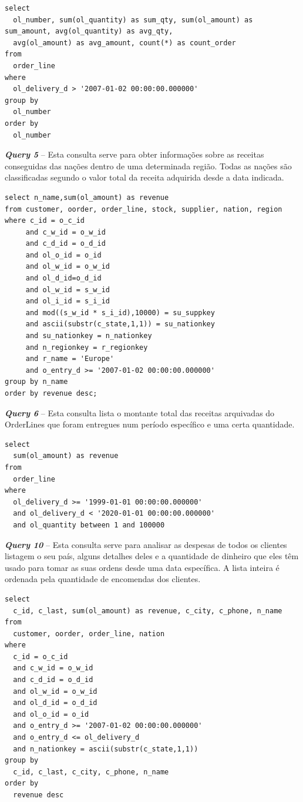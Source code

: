 \begin{verbatim}
select
  ol_number, sum(ol_quantity) as sum_qty, sum(ol_amount) as sum_amount, avg(ol_quantity) as avg_qty,
  avg(ol_amount) as avg_amount, count(*) as count_order
from
  order_line
where
  ol_delivery_d > '2007-01-02 00:00:00.000000'
group by
  ol_number
order by
  ol_number
\end{verbatim}


\textbf{\textit{Query 5}} – Esta consulta serve para obter informações sobre as receitas conseguidas das nações dentro de uma determinada região. Todas as nações são classificadas segundo o valor total da receita adquirida desde a data indicada.

\begin{verbatim}
select n_name,sum(ol_amount) as revenue
from customer, oorder, order_line, stock, supplier, nation, region
where c_id = o_c_id
     and c_w_id = o_w_id
     and c_d_id = o_d_id
     and ol_o_id = o_id
     and ol_w_id = o_w_id
     and ol_d_id=o_d_id
     and ol_w_id = s_w_id
     and ol_i_id = s_i_id
     and mod((s_w_id * s_i_id),10000) = su_suppkey
     and ascii(substr(c_state,1,1)) = su_nationkey
     and su_nationkey = n_nationkey
     and n_regionkey = r_regionkey
     and r_name = 'Europe'
     and o_entry_d >= '2007-01-02 00:00:00.000000'
group by n_name
order by revenue desc;
\end{verbatim}


\textbf{\textit{Query 6}} – Esta consulta lista o montante total das receitas arquivadas do OrderLines que foram entregues num período específico e uma certa quantidade.

\begin{verbatim}
select
  sum(ol_amount) as revenue
from
  order_line
where
  ol_delivery_d >= '1999-01-01 00:00:00.000000'
  and ol_delivery_d < '2020-01-01 00:00:00.000000'
  and ol_quantity between 1 and 100000
\end{verbatim}

\textbf{\textit{Query 10}} – Esta consulta serve para analisar as despesas de todos os clientes listagem o seu país, alguns detalhes deles e a quantidade de dinheiro que eles têm usado para tomar as suas ordens desde uma data específica. A lista inteira é ordenada pela quantidade de encomendas dos clientes.

\begin{verbatim}
select
  c_id, c_last, sum(ol_amount) as revenue, c_city, c_phone, n_name
from
  customer, oorder, order_line, nation
where
  c_id = o_c_id
  and c_w_id = o_w_id
  and c_d_id = o_d_id
  and ol_w_id = o_w_id
  and ol_d_id = o_d_id
  and ol_o_id = o_id
  and o_entry_d >= '2007-01-02 00:00:00.000000'
  and o_entry_d <= ol_delivery_d
  and n_nationkey = ascii(substr(c_state,1,1))
group by
  c_id, c_last, c_city, c_phone, n_name
order by
  revenue desc
\end{verbatim}


